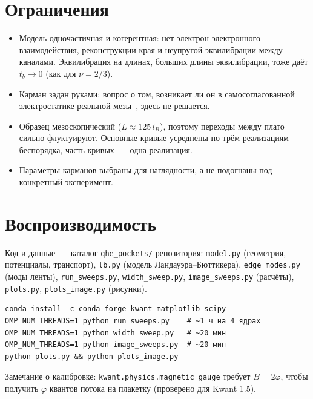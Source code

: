 \documentclass[11pt,a4paper]{article}
\newcommand{\tb}{t_b}
\newcommand{\lB}{l_B}
\begin{document}
\section{Ограничения}
\begin{itemize}
\item Модель одночастичная и когерентная: нет электрон-электронного
  взаимодействия, реконструкции края и неупругой эквилибрации между каналами.
  Эквилибрация на длинах, больших длины эквилибрации, тоже даёт $\tb\to0$
  (как для $\nu=2/3$).
\item Карман задан руками; вопрос о том, возникает ли он в самосогласованной
  электростатике реальной мезы~\cite{ciuti,chklovskii}, здесь не решается.
\item Образец мезоскопический ($L\approx125\,\lB$), поэтому переходы между
  плато сильно флуктуируют. Основные кривые усреднены по трём реализациям
  беспорядка, часть кривых~--- одна реализация.
\item Параметры карманов выбраны для наглядности, а не подогнаны под
  конкретный эксперимент.
\end{itemize}

\appendix
\section{Воспроизводимость}
{\raggedright Код и данные~--- каталог \texttt{qhe\_pockets/} репозитория:
\texttt{model.py} (геометрия, потенциалы, транспорт), \texttt{lb.py}
(модель Ландауэра--Бюттикера), \texttt{edge\_modes.py} (моды ленты),
\texttt{run\_sweeps.py}, \texttt{width\_sweep.py}, \texttt{image\_sweeps.py}
(расчёты), \texttt{plots.py}, \texttt{plots\_image.py} (рисунки).\par}
\begin{verbatim}
conda install -c conda-forge kwant matplotlib scipy
OMP_NUM_THREADS=1 python run_sweeps.py    # ~1 ч на 4 ядрах
OMP_NUM_THREADS=1 python width_sweep.py   # ~20 мин
OMP_NUM_THREADS=1 python image_sweeps.py  # ~20 мин
python plots.py && python plots_image.py
\end{verbatim}
Замечание о калибровке: \texttt{kwant.physics.magnetic\_gauge} требует
$B=2\varphi$, чтобы получить $\varphi$ квантов потока на плакетку (проверено
для Kwant 1.5).
\end{document}
